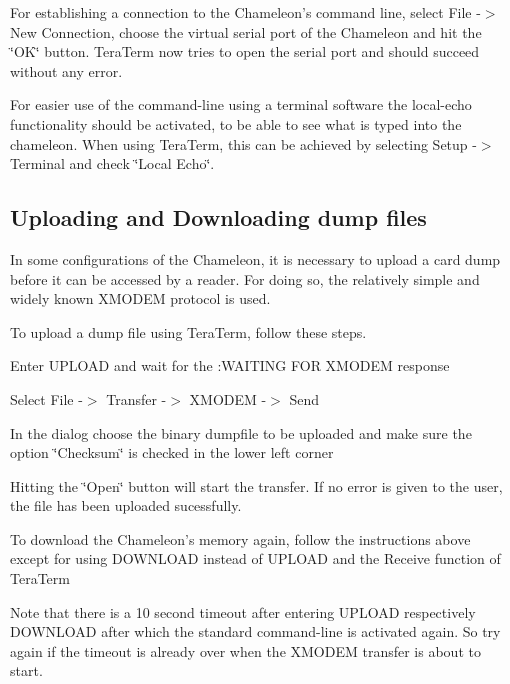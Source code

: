 For establishing a connection to the Chameleon's command line, select File -\/$>$ New Connection, choose the virtual serial port of the Chameleon and hit the \char`\"{}\-O\-K\char`\"{} button. Tera\-Term now tries to open the serial port and should succeed without any error.

For easier use of the command-\/line using a terminal software the local-\/echo functionality should be activated, to be able to see what is typed into the chameleon. When using Tera\-Term, this can be achieved by selecting Setup -\/$>$ Terminal and check \char`\"{}\-Local Echo\char`\"{}.

\subsection*{Uploading and Downloading dump files }

In some configurations of the Chameleon, it is necessary to upload a card dump before it can be accessed by a reader. For doing so, the relatively simple and widely known X\-M\-O\-D\-E\-M protocol is used.

To upload a dump file using Tera\-Term, follow these steps.
\begin{DoxyEnumerate}
\item Enter {\ttfamily U\-P\-L\-O\-A\-D} and wait for the {\-:W\-A\-I\-T\-I\-N\-G F\-O\-R X\-M\-O\-D\-E\-M} response
\item Select File -\/$>$ Transfer -\/$>$ X\-M\-O\-D\-E\-M -\/$>$ Send
\item In the dialog choose the binary dumpfile to be uploaded and make sure the option \char`\"{}\-Checksum\char`\"{} is checked in the lower left corner
\item Hitting the \char`\"{}\-Open\char`\"{} button will start the transfer. If no error is given to the user, the file has been uploaded sucessfully.
\end{DoxyEnumerate}

To download the Chameleon's memory again, follow the instructions above except for using {\ttfamily D\-O\-W\-N\-L\-O\-A\-D} instead of {\ttfamily U\-P\-L\-O\-A\-D} and the Receive function of Tera\-Term

Note that there is a 10 second timeout after entering {\ttfamily U\-P\-L\-O\-A\-D} respectively {\ttfamily D\-O\-W\-N\-L\-O\-A\-D} after which the standard command-\/line is activated again. So try again if the timeout is already over when the X\-M\-O\-D\-E\-M transfer is about to start. 